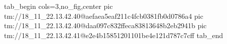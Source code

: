  
 
 
 
 

\qqSecOrig


\ifcmt
  tab_begin cols=3,no_fig,center
    pic tm://18_11_22.13.42.40@aefaea5eaf211c4fcb0381fb0d0786a4
    pic tm://18_11_22.13.42.40@daa097c832ffeca83813648b2eb2941b
    pic tm://18_11_22.13.42.41@e2e4b15851201101be4e121d787c7cff
  tab_end
\fi

